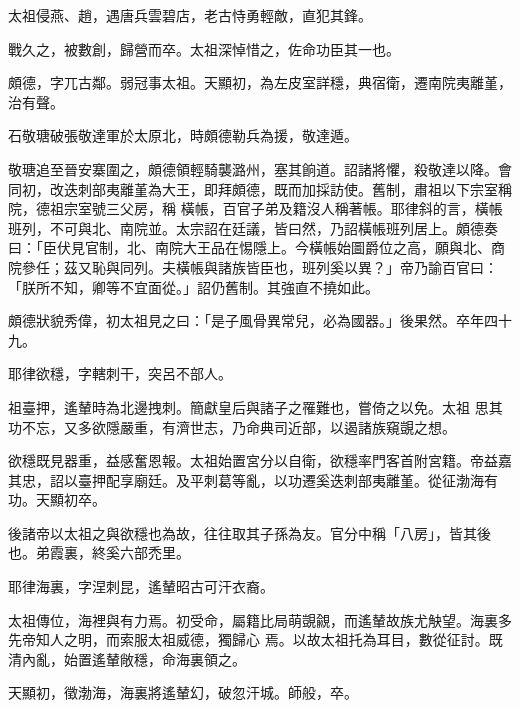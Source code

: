 \begin{pinyinscope}
 太祖侵燕、趙，遇唐兵雲碧店，老古恃勇輕敵，直犯其鋒。



 戰久之，被數創，歸營而卒。太祖深悼惜之，佐命功臣其一也。



 頗德，字兀古鄰。弱冠事太祖。天顯初，為左皮室詳穩，典宿衛，遷南院夷離堇，治有聲。



 石敬瑭破張敬達軍於太原北，時頗德勒兵為援，敬達遁。



 敬瑭追至晉安寨圍之，頗德領輕騎襲潞州，塞其餉道。詔諸將懼，殺敬達以降。會同初，改迭刺部夷離堇為大王，即拜頗德，既而加採訪使。舊制，肅祖以下宗室稱院，德祖宗室號三父房，稱
 橫帳，百官子弟及籍沒人稱著帳。耶律斜的言，橫帳班列，不可與北、南院並。太宗詔在廷議，皆曰然，乃詔橫帳班列居上。頗德奏曰：「臣伏見官制，北、南院大王品在惕隱上。今橫帳始圖爵位之高，願與北、商院參任；茲又恥與同列。夫橫帳與諸族皆臣也，班列奚以異？」帝乃諭百官曰：「朕所不知，卿等不宜面從。」詔仍舊制。其強直不撓如此。



 頗德狀貌秀偉，初太祖見之曰：「是子風骨異常兒，必為國器。」後果然。卒年四十九。



 耶律欲穩，字轄刺干，突呂不部人。



 祖臺押，遙輦時為北邊拽刺。簡獻皇后與諸子之罹難也，嘗倚之以免。太祖
 思其功不忘，又多欲隱嚴重，有濟世志，乃命典司近部，以遏諸族窺覬之想。



 欲穩既見器重，益感奮恩報。太祖始置宮分以自衛，欲穩率門客首附宮籍。帝益嘉其忠，詔以臺押配享廟廷。及平刺葛等亂，以功遷奚迭刺部夷離堇。從征渤海有功。天顯初卒。



 後諸帝以太祖之與欲穩也為故，往往取其子孫為友。官分中稱「八房」，皆其後也。弟霞裏，終奚六部禿里。



 耶律海裏，字涅刺昆，遙輦昭古可汗衣裔。



 太祖傳位，海裡與有力焉。初受命，屬籍比局萌覬覦，而遙輦故族尤觖望。海裏多先帝知人之明，而索服太祖威德，獨歸心
 焉。以故太祖托為耳目，數從征討。既清內亂，始置遙輦敞穩，命海裏領之。



 天顯初，徵渤海，海裏將遙輦幻，破忽汗城。師般，卒。



\end{pinyinscope}